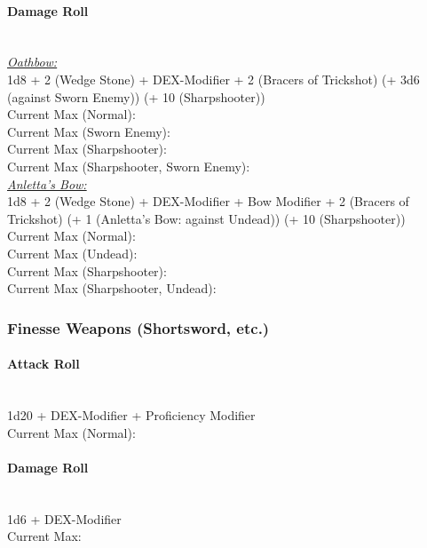 \documentclass[letterpaper,openany,oneside,twocolumn]{book}
\begin{document}
\paragraph*{Damage Roll}\hfill\\
\underline{\textit{Oathbow:}}\\
1d8 + 2 (Wedge Stone) + DEX-Modifier + 2 (Bracers of Trickshot) (+ 3d6 (against Sworn Enemy)) (+ 10 (Sharpshooter)) \\
\indent Current Max (Normal):  \\
\indent Current Max (Sworn Enemy):  \\
\indent Current Max (Sharpshooter):  \\
\indent Current Max (Sharpshooter, Sworn Enemy): \\
\underline{\textit{Anletta's Bow:}}\\
1d8 + 2 (Wedge Stone) + DEX-Modifier + Bow Modifier + 2 (Bracers of Trickshot) (+ 1 (Anletta's Bow: against Undead)) (+ 10 (Sharpshooter)) \\
\indent Current Max (Normal):  \\
\indent Current Max (Undead):  \\
\indent Current Max (Sharpshooter):  \\
\indent Current Max (Sharpshooter, Undead): 
\subsubsection*{Finesse Weapons (Shortsword, etc.)}
\paragraph*{Attack Roll}\hfill\\
1d20 + DEX-Modifier + Proficiency Modifier \\
\indent Current Max (Normal): 
\paragraph*{Damage Roll}\hfill\\
1d6 + DEX-Modifier \\
\indent Current Max: 
\end{document}
